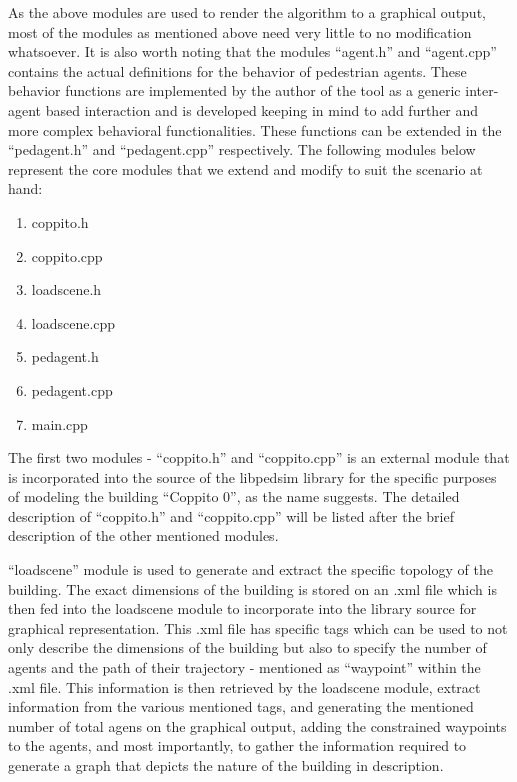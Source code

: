 As the above modules are used to render the algorithm to a graphical output, most of the modules as mentioned above need very little to no modification whatsoever. It is also worth noting that the modules “agent.h” and “agent.cpp” contains the actual definitions for the behavior of pedestrian agents. These behavior functions are implemented by the author of the tool as a generic inter-agent based interaction and is developed keeping in mind to add further and more complex behavioral functionalities. These functions can be extended in the “ped\textunderscore agent.h” and “ped\textunderscore agent.cpp” respectively. 
The following modules below represent the core modules that we extend and modify to suit the scenario at hand:

\begin{enumerate}
  \item coppito.h
  \item coppito.cpp
  \item loadscene.h
  \item loadscene.cpp
  \item ped\textunderscore agent.h
  \item ped\textunderscore agent.cpp
  \item main.cpp
\end{enumerate}

The first two modules - “coppito.h” and “coppito.cpp” is an external module that is incorporated into the source of the libpedsim library for the specific purposes of modeling the building “Coppito 0”, as the name suggests. The detailed description of “coppito.h” and “coppito.cpp” will be listed after the brief description of the other mentioned modules. 

“loadscene” module is used to generate and extract the specific topology of the building. The exact dimensions of the building is stored on an .xml file which is then fed into the loadscene module to incorporate into the library source for graphical representation. This .xml file has specific tags which can be used to not only describe the dimensions of the building but also to specify the number of agents and the path of their trajectory - mentioned as “waypoint” within the .xml file. This information is then retrieved by the loadscene module, extract information from the various mentioned tags, and generating the mentioned number of total agens on the graphical output, adding the constrained waypoints to the agents, and most importantly, to gather the information required to generate a graph that depicts the nature of the building in description.

